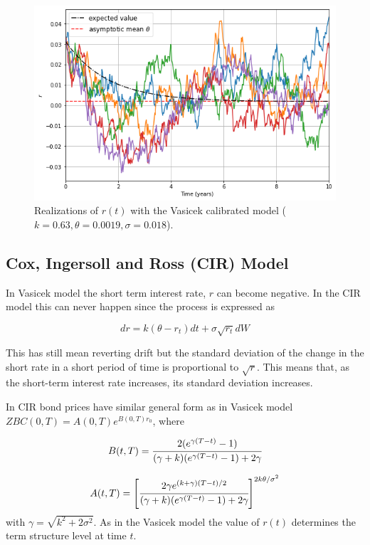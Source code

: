 \begin{figure}[htb]
\centering
\includegraphics[width=0.7\linewidth]{figures/vasicek_calibrated_paths}
\caption{Realizations of $r(t)$ with the Vasicek calibrated model ($k=0.63, \theta=0.0019, \sigma=0.018$).}
\label{fig:vasicek_calibrated_paths}
\end{figure}

\subsection{Cox, Ingersoll and Ross (CIR) Model}
\label{cox-ingersoll-and-ross-cir-model}

In Vasicek model the short term interest rate, $r$ can become negative. In the CIR model this can never happen since the process is expressed as

\begin{equation}
dr = k(\theta - r_t)dt + \sigma\sqrt{r_t}dW
\label{eq:cir_process}
\end{equation}

This has still mean reverting drift but the standard deviation of the change in the short rate in a short period of time is proportional to $\sqrt{r}$. This means that, as the short-term interest rate increases, its standard deviation increases.

In CIR bond prices have similar general form as in Vasicek model $ZBC(0, T)=A(0, T)e^{B(0, T)r_0}$, where

\begin{equation}
B(t, T) = \cfrac{2(e^{\gamma(T-t)}-1)}{(\gamma+k)(e^{\gamma(T-t)}-1)+2\gamma}
\label{eq:cir_B_param}
\end{equation}

\begin{equation}
A(t, T) = \left[\cfrac{2\gamma e^{(k+\gamma)(T-t)/2}}{(\gamma+k)(e^{\gamma(T-t)}-1)+2\gamma}\right]^{2k\theta /\sigma^2}
\label{eq:cir_A_param}
\end{equation}
with $\gamma = \sqrt {k^2 + 2\sigma^2}$. As in the Vasicek model the value of $r(t)$ determines the term structure level at time $t$.

